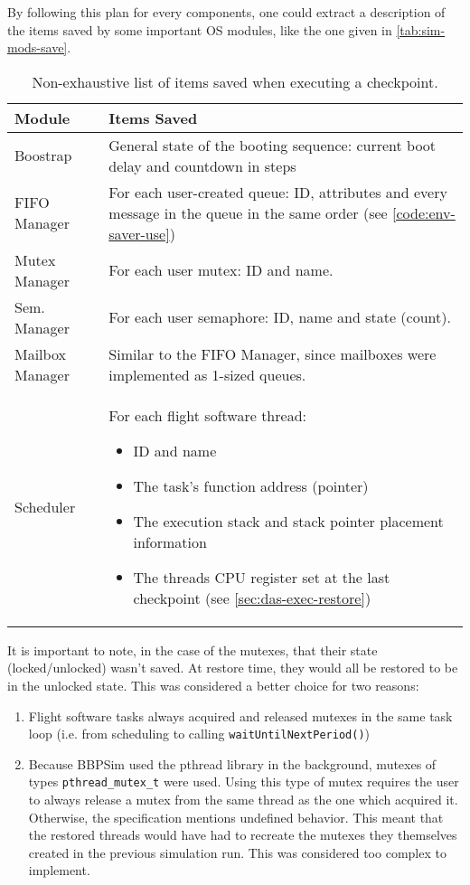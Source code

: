 {By following this plan for every components, one could extract a description of the items saved by some important OS modules, like the one given in  \autoref{tab:sim-mods-save}. 

\begin{table}[H]
	\centering
	\begin{tabularx}{\linewidth}{l X}
		\toprule
		\textbf{Module} & \textbf{Items Saved}\\
		\midrule
		Boostrap & {General state of the booting sequence: current boot delay and countdown in steps}\\
		\midrule
		FIFO Manager & {For each user-created queue: ID, attributes and every message in the queue in the same order (see \autoref{code:env-saver-use})}\\
		\midrule
		Mutex Manager & {For each user mutex: ID and name.}\\
		\midrule
		Sem. Manager & {For each user semaphore: ID, name and state (count).}\\	
		\midrule
		Mailbox Manager & {Similar to the FIFO Manager, since mailboxes were implemented as 1-sized queues.}\\
		\midrule
		Scheduler & {For each flight software thread:
		\vspace{-6pt}
		\begin{itemize}\setlength\itemsep{0em}
			\item ID and name
			\item The task's function address (pointer)
			\item The execution stack and stack pointer placement information
			\item The threads CPU register set at the last checkpoint (see \autoref{sec:das-exec-restore})
		\end{itemize}	
		}\\
		\bottomrule
	\end{tabularx}
	\caption{Non-exhaustive list of items saved when executing a checkpoint.}
	\label{tab:sim-mods-save}
\end{table}

It is important to note, in the case of the mutexes, that their state (locked/unlocked) wasn't saved. At restore time, they would all be restored to be in the unlocked state. This was considered a better choice for two reasons: 
\begin{enumerate}
	\item Flight software tasks always acquired and released mutexes in the same task loop (i.e. from scheduling to calling \texttt{waitUntilNextPeriod()})
	\item Because \gls{BBPSim} used the pthread library in the background, mutexes of types \texttt{pthread_mutex_t} were used. Using this type of mutex requires the user to always release a mutex from the same thread as the one which acquired it. Otherwise, the specification mentions undefined behavior\cite{online:pthread-mutex}. This meant that the restored threads would have had to recreate the mutexes they themselves created in the previous simulation run. This was considered too complex to implement.
\end{enumerate}

}
